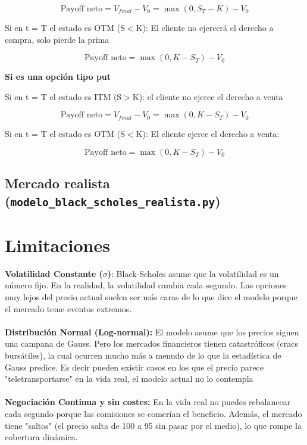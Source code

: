 \documentclass[11pt]{article}
\newcommand{\comillas}[1]{"#1"} %
\begin{document}
				\begin{equation}
					\text{Payoff neto} = V_{final} - V_0 = \max(0,S_T - K) - V_0
				\end{equation}
			
				Si en t = T el estado es OTM (S$<$K): El cliente no ejercerá el derecho a compra, solo pierde la prima
			
				\begin{equation}
					\text{Payoff neto} = \max(0,K - S_T) - V_0
				\end{equation}
			
				\textbf{Si es una opción tipo put}
			
				Si en t = T el estado es ITM (S$>$K): el cliente no ejerce el derecho a venta
			
				\begin{equation}
					\text{Payoff neto} = V_{final} - V_0 = \max(0,K - S_T) - V_0
				\end{equation}
			
				Si en t = T el estado es OTM (S$<$K): El cliente ejerce el derecho a venta:
			
				\begin{equation}
					\text{Payoff neto} = \max(0,K - S_T) - V_0
				\end{equation}
		
		\subsection{Mercado realista (\texttt{modelo\_black\_scholes\_realista.py})} 
		
	\newpage
	\section{Limitaciones}
		\textbf{Volatilidad Constante ($\sigma$)}: Black-Scholes asume que la volatilidad es un número fijo. En la realidad, la volatilidad cambia cada segundo. Las opciones muy lejos del precio actual suelen ser más caras de lo que dice el modelo porque el mercado teme eventos extremos.\\
		\\
		\textbf{Distribución Normal (Log-normal):} El modelo asume que los precios siguen una campana de Gauss. Pero los mercados financieros tienen catastróficos (cracs bursátiles), la cual ocurren mucho más a menudo de lo que la estadística de Gauss predice. Es decir pueden existir casos en los que el precio parece \comillas{teletransportarse} en la vida real, el modelo actual no lo contempla\\
		\\
		\textbf{Negociación Continua y sin costes:} En la vida real no puedes rebalancear cada segundo porque las comisiones se comerían el beneficio. Además, el mercado tiene \comillas{saltos} (el precio salta de 100 a 95 sin pasar por el medio), lo que rompe la cobertura dinámica.
	
	
	\renewcommand{\refname}{Bibliografía}
	
\end{document}
